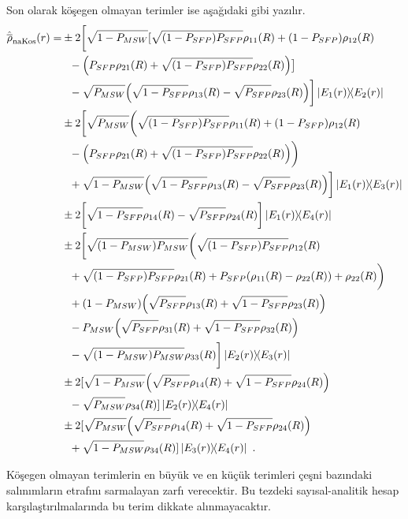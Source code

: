 Son olarak köşegen olmayan terimler ise aşağıdaki gibi yazılır.
{\footnotesize
\begin{align}
    \nonumber\hat{\overline{\rho}}_{\text{naKos}}(r) =&\pm 2 \bigg[\sqrt{1-P_{MSW}} [\sqrt{\qty(1-P_{SFP}) P_{SFP}}\rho_{11}(R)+ \qty(1-P_{SFP})\rho_{12}(R)\\
    \nonumber &~~-\qty(P_{SFP}\rho_{21}(R)+\sqrt{\qty(1-P_{SFP}) P_{SFP}} \rho_{22}(R))\big]\\
    \nonumber &~~-\sqrt{P_{MSW}} \qty(\sqrt{1-P_{SFP}}\rho_{13}(R)-\sqrt{P_{SFP}} \rho_{23}(R))\bigg]\dyad{E_{1}(r)}{E_{2}(r)}\\
    \nonumber&\pm 2 \bigg[\sqrt{P_{MSW}} \bigg(\sqrt{\qty(1-P_{SFP})P_{SFP}} \rho _{11}(R) +\qty(1-P_{SFP})\rho_{12}(R)\\
    \nonumber &~~-\qty(P_{SFP}\rho_{21}(R)+\sqrt{\qty(1-P_{SFP})P_{SFP}}\rho _{22}(R))\bigg)\\
    \nonumber &~~ +\sqrt{1-P_{MSW}} \qty(\sqrt{1-P_{SFP}}\rho_{13}(R)-\sqrt{P_{SFP}}\rho _{23}(R))\bigg] \dyad{E_{1}(r)}{E_{3}(r)}\\
    \nonumber&\pm 2\bigg[\sqrt{1-P_{SFP}}\rho_{14}(R)-\sqrt{P_{SFP}}\rho _{24}(R)\bigg] \dyad{E_{1}(r)}{E_{4}(r)}\\
    \nonumber&\pm 2\bigg[\sqrt{\qty(1-P_{MSW}) P_{MSW}} \bigg(\sqrt{\qty(1-P_{SFP})P_{SFP}} \rho_{12}(R)\\
    \nonumber&~~+\sqrt{\qty(1-P_{SFP}) P_{SFP}} \rho_{21}(R)+P_{SFP}\qty(\rho_{11}(R)-\rho_{22}(R))+\rho_{22}(R)\bigg)\\
    \nonumber&~~+\qty(1-P_{MSW}) \qty(\sqrt{P_{SFP}} \rho _{13}(R)+ \sqrt{1-P_{SFP}} \rho_{23}(R))\\
    \nonumber&~~-P_{MSW} \qty(\sqrt{P_{SFP}} \rho _{31}(R)+ \sqrt{1-P_{SFP}}\rho _{32}(R))\\
    \nonumber&~~-\sqrt{\qty(1-P_{MSW})P_{MSW}} \rho _{33}(R)\bigg] \dyad{E_{2}(r)}{E_{3}(r)}\\
    \nonumber&\pm 2[\sqrt{1-P_{MSW}} \qty(\sqrt{P_{SFP}}\rho_{14}(R)+\sqrt{1-P_{SFP}}\rho_{24}(R))\\
    \nonumber&~~-\sqrt{P_{MSW}}\rho_{34}(R)]\dyad{E_{2}(r)}{E_{4}(r)}\\
    \nonumber&\pm 2[\sqrt{P_{MSW}} \qty(\sqrt{P_{SFP}}\rho_{14}(R)+\sqrt{1-P_{SFP}}\rho_{24}(R))\\
    &~~+\sqrt{1-P_{MSW}}\rho_{34}(R)]\dyad{E_{3}(r)}{E_{4}(r)} \text{ .}
\end{align}}

Köşegen olmayan terimlerin en büyük ve en küçük terimleri çeşni bazındaki salınımların etrafını sarmalayan zarfı verecektir. Bu tezdeki sayısal-analitik hesap karşılaştırılmalarında bu terim dikkate alınmayacaktır.

